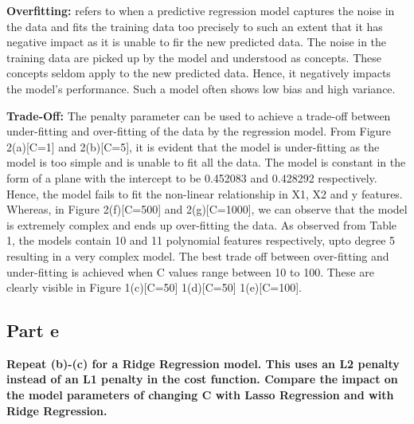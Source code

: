 \documentclass[10pt]{article}
\begin{document}
\textbf{Overfitting:} refers to when a predictive regression model captures the
noise in the data and fits the training data too precisely to such an
extent that it has negative impact as it is unable to fir the new predicted data.
The noise in the training data are picked up by the model and understood as concepts.
These concepts seldom apply to the new predicted data. Hence, it negatively impacts
the model's performance. Such a model often shows low bias and high variance.

\textbf{Trade-Off:} The penalty parameter can be used to achieve a trade-off between
under-fitting and over-fitting of the data by the regression model. From Figure 2(a)[C=1]
and 2(b)[C=5], it is evident that the model is under-fitting as the model is too simple
and is unable to fit all the data. The model is constant in the form of a plane with the
intercept to be 0.452083 and 0.428292 respectively. Hence, the model fails to fit the
non-linear relationship in X1, X2 and y features. Whereas, in Figure 2(f)[C=500] and 2(g)[C=1000],
we can observe that the model is extremely complex and ends up over-fitting the data.
As observed from Table 1, the models contain 10 and 11 polynomial features respectively,
upto degree 5 resulting in a very complex model.
The best trade off between over-fitting and under-fitting is achieved when C values range
between 10 to 100. These are clearly visible in Figure 1(c)[C=50] 1(d)[C=50] 1(e)[C=100].

\subsection*{Part e}
\textbf{Repeat (b)-(c) for a Ridge Regression model. This uses an L2 penalty instead of
  an L1 penalty in the cost function. Compare the impact on the model parameters
  of changing C with Lasso Regression and with Ridge Regression.}
\end{document}
